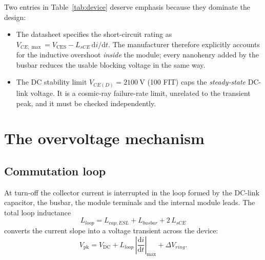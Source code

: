 \documentclass[11pt,a4paper]{article}
\newcommand{\Vces}{V_{\mathrm{CES}}}
\newcommand{\Vdc}{V_{\mathrm{DC}}}
\newcommand{\Vpk}{V_{\mathrm{pk}}}
\begin{document}
Two entries in Table~\ref{tab:device} deserve emphasis because they dominate
the design:

\begin{itemize}[nosep]
\item The datasheet specifies the short-circuit rating as
      $V_{CE,\max} = \Vces - L_{sCE}\,\mathrm{d}i/\mathrm{d}t$. The
      manufacturer therefore explicitly accounts for the inductive overshoot
      \emph{inside} the module; every nanohenry added by the busbar reduces
      the usable blocking voltage in the same way.
\item The DC stability limit $V_{CE(D)} = \SI{2100}{\volt}$ (100 FIT) caps the
      \emph{steady-state} DC-link voltage. It is a cosmic-ray failure-rate
      limit, unrelated to the transient peak, and it must be checked
      independently.
\end{itemize}

\section{The overvoltage mechanism}

\subsection{Commutation loop}

At turn-off the collector current is interrupted in the loop formed by the
DC-link capacitor, the busbar, the module terminals and the internal module
leads. The total loop inductance
\begin{equation}
L_{loop} = L_{cap,ESL} + L_{busbar} + 2\,L_{sCE}
\label{eq:loop}
\end{equation}
converts the current slope into a voltage transient across the device:
\begin{equation}
\Vpk = \Vdc + L_{loop}\,\left|\frac{\mathrm{d}i}{\mathrm{d}t}\right|_{\max}
       + \Delta V_{ring}.
\label{eq:vpk}
\end{equation}
\end{document}
